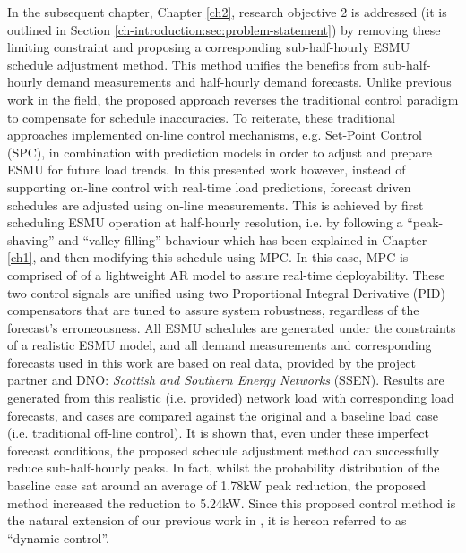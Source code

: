 In the subsequent chapter, Chapter \ref{ch2}, research objective 2 is addressed (it is outlined in Section \ref{ch-introduction:sec:problem-statement}) by removing these limiting constraint and proposing a corresponding sub-half-hourly ESMU schedule adjustment method.
This method unifies the benefits from sub-half-hourly demand measurements and half-hourly demand forecasts.
Unlike previous work in the field, the proposed approach reverses the traditional control paradigm to compensate for schedule inaccuracies.
To reiterate, these traditional approaches implemented on-line control mechanisms, e.g. Set-Point Control (SPC), in combination with prediction models in order to adjust and prepare ESMU for future load trends.
In this presented work however, instead of supporting on-line control with real-time load predictions, forecast driven schedules are adjusted using on-line measurements.
This is achieved by first scheduling ESMU operation at half-hourly resolution, i.e. by following a ``peak-shaving'' and ``valley-filling'' behaviour which has been explained in Chapter \ref{ch1}, and then modifying this schedule using MPC.
In this case, MPC is comprised of of a lightweight AR model to assure real-time deployability.
These two control signals are unified using two Proportional Integral Derivative (PID) compensators that are tuned to assure system robustness, regardless of the forecast's erroneousness.
All ESMU schedules are generated under the constraints of a realistic ESMU model, and all demand measurements and corresponding forecasts used in this work are based on real data, provided by the project partner and DNO: \textit{Scottish and Southern Energy Networks} (SSEN).
Results are generated from this realistic (i.e. provided) network load with corresponding load forecasts, and cases are compared against the original and a baseline load case (i.e. traditional off-line control).
It is shown that, even under these imperfect forecast conditions, the proposed schedule adjustment method can successfully reduce sub-half-hourly peaks.
In fact, whilst the probability distribution of the baseline case sat around an average of 1.78kW peak reduction, the proposed method increased the reduction to 5.24kW.
Since this proposed control method is the natural extension of our previous work in \cite{Zangs2016}, it is hereon referred to as ``dynamic control''.

